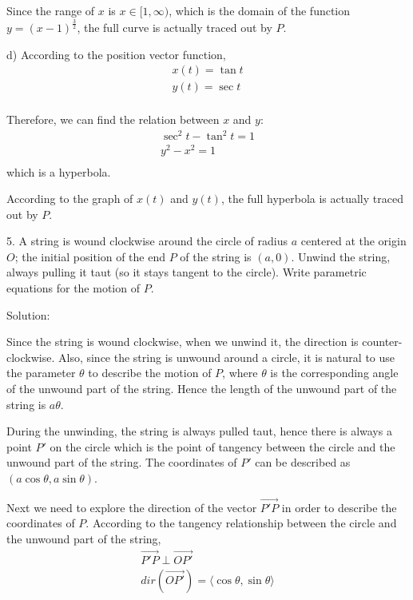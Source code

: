 \documentclass{article}
\begin{document}
Since the range of $x$ is $x \in [1, \infty)$, which is the domain of the 
function $y = (x - 1)^{\frac{3}{2}}$, the full curve is actually traced out by 
$P$.

d) According to the position vector function,
\begin{gather*}
  x(t) = \tan t \\
  y(t) = \sec t \\
\end{gather*}

Therefore, we can find the relation between $x$ and $y$:
\begin{gather*}
  \sec^2 t - \tan^2 t = 1 \\
  y^2 - x^2 = 1 \\
\end{gather*}
which is a hyperbola.

According to the graph of $x(t)$ and $y(t)$, the full hyperbola is actually 
traced out by $P$.

\bigskip

5. A string is wound clockwise around the circle of radius $a$ centered at the 
origin $O$; the initial position of the end $P$ of the string is $(a, 0)$. 
Unwind the string, always pulling it taut (so it stays tangent to the circle). 
Write parametric equations for the motion of $P$.

Solution:

Since the string is wound clockwise, when we unwind it, the direction is 
counter-clockwise. Also, since the string is unwound around a circle, it is 
natural to use the parameter $\theta$ to describe the motion of $P$, where 
$\theta$ is the corresponding angle of the unwound part of the string. Hence the 
length of the unwound part of the string is $a \theta$.

During the unwinding, the string is always pulled taut, hence there is always a 
point $P'$ on the circle which is the point of tangency between the circle and 
the unwound part of the string. The coordinates of $P'$ can be described as 
$(a \cos\theta, a \sin\theta)$.

Next we need to explore the direction of the vector $\vec{P'P}$ in order to 
describe the coordinates of $P$. According to the tangency relationship between 
the circle and the unwound part of the string,
\begin{gather*}
  \vec{P'P} \perp \vec{OP'} \\
  dir(\vec{OP'}) = \langle \cos\theta, \sin\theta \rangle \\
\end{gather*}
\end{document}
